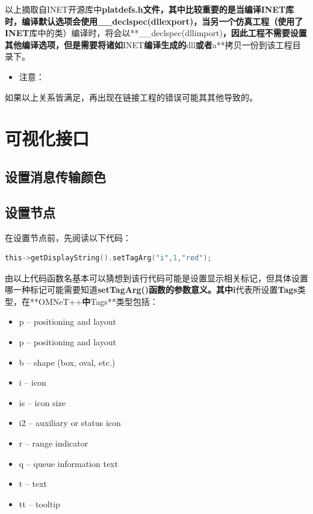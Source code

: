 以上摘取自INET开源库中\textbf{platdefs.h\textbf{文件，其中比较重要的是当编译INET库时，编译默认选项会使用}\_\_declspec(dllexport)\textbf{，当另一个仿真工程（使用了}INET}库中的类）编译时，将会以**\_\_declspec(dllimport)\textbf{，因此工程不需要设置其他编译选项，但是需要将诸如}INET\textbf{编译生成的}dll\textbf{或者}a**拷贝一份到该工程目录下。

\begin{itemize}
\item 注意：

\end{itemize}

如果以上关系皆满足，再出现在链接工程的错误可能其其他导致的。

\section{可视化接口}
\label{可视化接口}

\subsection{设置消息传输颜色}
\label{设置消息传输颜色}

\subsection{设置节点}
\label{设置节点}

在设置节点前，先阅读以下代码：

\begin{lstlisting}[language=c,caption=an]
this->getDisplayString().setTagArg("i",1,"red");
\end{lstlisting}

由以上代码函数名基本可以猜想到该行代码可能是设置显示相关标记，但具体设置哪一种标记可能需要知道\textbf{setTagArg()\textbf{函数的参数意义。其中}i}代表所设置\textbf{Tags}类型，在**OMNeT++\textbf{中}Tags**类型包括：

\begin{itemize}
\item p -- positioning and layout

\item p -- positioning and layout

\item b -- shape (box, oval, etc.)

\item i -- icon

\item is -- icon size

\item i2 -- auxiliary or status icon

\item r -- range indicator

\item q -- queue information text

\item t -- text

\item tt -- tooltip

\end{itemize}


